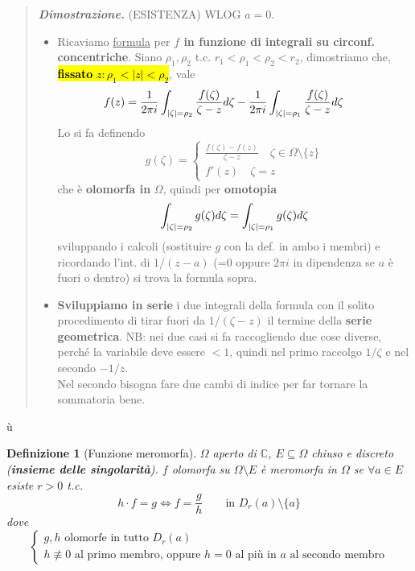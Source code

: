 \documentclass[a4paper,10pt]{article}
\newcommand{\im}{\mathbb{C}} %
\theoremstyle{indentdefinition}
\newtheorem{defn}{Definizione}[section]
\theoremstyle{indenttheorem}
\theoremstyle{myremark}
\theoremstyle{indentgeneral}
\newenvironment{dimo}{\begin{quote}\textit{\textbf{Dimostrazione.}}}{\end{quote}} %
\begin{document}
\begin{dimo}
   (ESISTENZA) WLOG $a=0$. 
    \begin{itemize}
        \item Ricaviamo \underline{formula} per\textbf{ $f$ in funzione di integrali su circonf. concentriche}. Siano $\rho_1,\rho_2$ t.c. $r_1<\rho_1<\rho_2<r_2$, dimostriamo che, \hl{\textbf{fissato} $z : \rho_1<|z|<\rho_2$}, vale
        $$f(z)=\frac{1}{2 \pi i}\int_{\abs{\zeta}=\rho_2}\frac{f(\zeta)}{\zeta-z}d\zeta-\frac{1}{2 \pi i}\int_{\abs{\zeta}=\rho_1}\frac{f(\zeta)}{\zeta-z}d\zeta \quad \quad $$
        Lo si fa definendo 
        $$g(\zeta)=
        \begin{cases}
            \frac{f(\zeta)-f(z)}{\zeta-z} \quad \zeta\in\Omega\setminus\{z\} \\
            f'(z) \quad \zeta=z            
        \end{cases}$$
        che è \textbf{olomorfa in} $\Omega$, quindi per \textbf{omotopia}
        $$\int_{\abs{\zeta}=\rho_2}g(\zeta)d\zeta=\int_{\abs{\zeta}=\rho_1}g(\zeta)d\zeta$$
        sviluppando i calcoli (sostituire $g$ con la def. in ambo i membri) e ricordando l'int. di $1/(z-a)$ (=$0$ oppure $2\pi i$ in dipendenza se  $a$ è fuori o dentro) si trova la formula sopra. 
        \item \textbf{Sviluppiamo in serie} i due integrali della formula con il solito procedimento di tirar fuori da $1/(\zeta-z)$ il termine della \textbf{serie geometrica}. NB: nei due casi si fa raccogliendo due cose diverse, perché la variabile deve essere $<1$, quindi nel primo raccolgo $1/\zeta$ e nel secondo $-1/z$. \\
        Nel secondo bisogna fare due cambi di indice per far tornare la sommatoria bene.
    \end{itemize}
\end{dimo}ù
\begin{defn}[Funzione meromorfa]
    $\Omega$ aperto di $\im$, $E\subseteq \Omega$ chiuso e discreto (\textbf{insieme delle singolarità}). $f$ olomorfa su $\Omega\setminus E$ è meromorfa in $\Omega$ se $\forall a\in E$ esiste $r>0$ t.c.
    $$h\cdot f=g \iff f=\frac{g}{h} \quad \quad \text{in } D_r(a)\setminus\{a\}$$
    dove
    $$\begin{cases}
        g,h \text{ olomorfe in tutto } D_r(a) \\
        h \not\equiv 0 \text{ al primo membro, oppure } h=0 \text{ al più in $a$ al secondo membro}
    \end{cases}$$
\end{defn}
\end{document}
